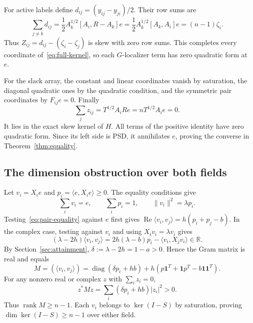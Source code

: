 \documentclass[11pt]{article}
\newcommand{\R}{\mathbb R}
\DeclareMathOperator{\diag}{diag}
\begin{document}
For active labels define $d_{ij}=(y_{ij}-y_{ji})/2$. Their row sums are
\[
 \sum_{j\ne k}d_{ij}
 =\frac12 A_k^{1/2}[A_i,R-A_k]e
 =\frac12 A_k^{1/2}[A_k,A_i]e=(n-1)\zeta_i.
\]
Thus $Z_{ij}=d_{ij}-(\zeta_i-\zeta_j)$ is skew with zero row sums.
This completes every coordinate of~\eqref{eq:full-kernel}, so each
$G$-localizer term has zero quadratic form at $e$.

For the slack array, the constant and linear coordinates vanish by
saturation, the diagonal quadratic ones by the quadratic condition,
and the symmetric pair coordinates by $F_{ij}e=0$. Finally
\[
 \sum_j z_{ij}=T^{1/2}A_iRe=nT^{1/2}A_i e=0.
\]
It lies in the exact skew kernel of $H$. All terms of the positive
identity have zero quadratic form. Since its left side is PSD, it
annihilates $e$, proving the converse in Theorem~\ref{thm:equality}.

\subsection{The dimension obstruction over both fields}
Let $v_i=X_ie$ and $p_i=\langle e,X_ie\rangle\ge0$.
The equality conditions give
\[
 \sum_i v_i=e,\qquad \sum_i p_i=1,\qquad
 \|v_i\|^2=\lambda p_i.
\]
Testing~\eqref{eq:pair-equality} against $e$ first gives
$\operatorname{Re}\langle v_i,v_j\rangle=h(p_i+p_j-b)$.
In the complex case, testing against $v_i$ and using
$X_iv_i=\lambda v_i$ gives
\[
 (\lambda-2h)\langle v_i,v_j\rangle
 =2h(\lambda-b)p_i-\langle v_i,X_jv_i\rangle\in\R.
\]
By Section~\ref{sec:attainment},
$\delta:=\lambda-2h=1-a>0$. Hence the Gram matrix is real and equals
\[
 M=(\langle v_i,v_j\rangle)
 =\diag(\delta p_i+hb)
       +h(p\mathbf1^T+\mathbf1p^T-b\mathbf1\mathbf1^T).
\]
For any nonzero real or complex $z$ with $\sum_i z_i=0$,
\[
 z^*Mz=\sum_i(\delta p_i+hb)|z_i|^2>0.
\]
Thus $\operatorname{rank}M\ge n-1$. Each $v_i$ belongs to
$\ker(I-S)$ by saturation, proving
$\dim\ker(I-S)\ge n-1$ over either field.
\end{document}
